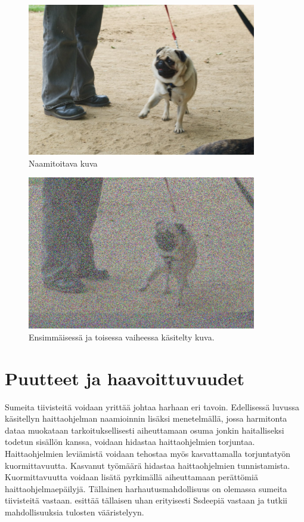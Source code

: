 \begin{figure}
   \centering
   \includegraphics[width=10cm]{../assets/dog-before.png}
   \caption{Naamitoitava kuva}
\end{figure}

\begin{figure}
   \centering
   \includegraphics[width=10cm]{../assets/dog-after.png}
   \caption{Ensimmäisessä ja toisessa vaiheessa käsitelty kuva.}
\end{figure}

\section{Puutteet ja haavoittuvuudet}

Sumeita tiivisteitä voidaan yrittää johtaa harhaan eri tavoin. Edellisessä
luvussa käsitellyn haittaohjelman naamioinnin lisäksi menetelmällä, jossa 
harmitonta dataa muokataan tarkoituksellisesti aiheuttamaan osuma jonkin
haitalliseksi todetun sisällön kanssa, voidaan hidastaa haittaohjelmien torjuntaa. 
Haittaohjelmien leviämistä voidaan tehostaa myös kasvattamalla torjuntatyön kuormittavuutta. Kasvanut työmäärä hidastaa haittaohjelmien tunnistamista. Kuormittavuutta voidaan lisätä pyrkimällä aiheuttamaan perättömiä haittaohjelmaepäilyjä. Tällainen
harhautusmahdollisuus on olemassa sumeita tiivisteitä vastaan. \textcite{ermerins} esittää tällaisen uhan erityisesti Ssdeepiä vastaan ja tutkii mahdollisuuksia tulosten vääristelyyn.

